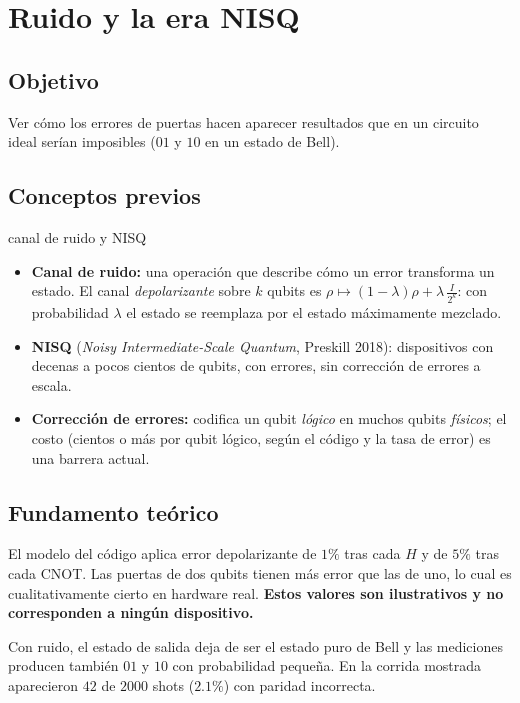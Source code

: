 \def\tituloconcepto{Ruido y la era NISQ}


\section{Ruido y la era NISQ}

\subsection{Objetivo}
Ver cómo los errores de puertas hacen aparecer resultados que en un circuito
ideal serían imposibles ($01$ y $10$ en un estado de Bell).

\subsection{Conceptos previos}
\begin{concepto}{canal de ruido y NISQ}
\begin{itemize}
  \item \textbf{Canal de ruido:} una operación que describe cómo un error
    transforma un estado. El canal \emph{depolarizante} sobre $k$ qubits es
    $\rho\mapsto(1-\lambda)\rho+\lambda\,\tfrac{I}{2^k}$: con probabilidad
    $\lambda$ el estado se reemplaza por el estado máximamente mezclado.
  \item \textbf{NISQ} (\emph{Noisy Intermediate-Scale Quantum}, Preskill 2018):
    dispositivos con decenas a pocos cientos de qubits, con errores, sin
    corrección de errores a escala.
  \item \textbf{Corrección de errores:} codifica un qubit \emph{lógico} en
    muchos qubits \emph{físicos}; el costo (cientos o más por qubit lógico,
    según el código y la tasa de error) es una barrera actual.
\end{itemize}
\end{concepto}

\subsection{Fundamento teórico}
El modelo del código aplica error depolarizante de $1\%$ tras cada $H$ y de
$5\%$ tras cada CNOT. Las puertas de dos qubits tienen más error que las de
uno, lo cual es cualitativamente cierto en hardware real. \textbf{Estos
valores son ilustrativos y no corresponden a ningún dispositivo.}

Con ruido, el estado de salida deja de ser el estado puro de Bell y las
mediciones producen también $01$ y $10$ con probabilidad pequeña. En la
corrida mostrada aparecieron $42$ de $2000$ shots ($2.1\%$) con paridad
incorrecta.

